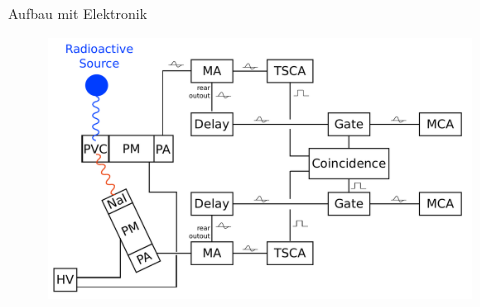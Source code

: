 \documentclass[xcolor=x11names,compress]{beamer}
\renewcommand{\(}{\begin{columns}}
\renewcommand{\)}{\end{columns}}
\newcommand{\<}[1]{\begin{column}{#1}}
\renewcommand{\>}{\end{column}}
\begin{document}
\begin{frame}[t]{Aufbau mit Elektronik}
 \begin{figure}[htpb]
    \centering
    \includegraphics[width=1.0\linewidth]{../figures/setup_pres}
\label{fig:setup_pre}
\end{figure}
\end{frame}
\end{document}

